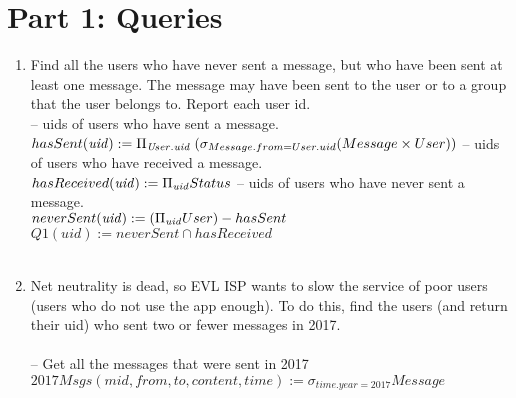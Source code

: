 \documentclass{article}
\newcommand{\var}[1]{\mathit{#1}}
\begin{document}
\section*{Part 1: Queries}

\begin{enumerate}

\item   %
Find all the users who have never sent a message, but who have been sent at least one message. The message may have been sent to the user or to a group that the user belongs to. Report each user id. \\

{\large %
\hspace*{1cm} --  uids of users who have sent a message. \\ [5pt]
$
hasSent(\var{uid}) :=
	\Pi_{\var{User.uid}}\;	%
	(\sigma_{Message.from = User.uid} 
	(Message \times User)) \\\\[5pt]
$
\hspace*{1cm} -- uids of users who have received a message. \\[5pt]
$
hasReceived(\var{uid}) := 
	\Pi_{\var{uid}} 
	Status 
	\\\\[5pt]
$
\hspace*{1cm} -- uids of users who have never sent a message. \\[5pt]
$
neverSent(\var{uid}) := 
	(\Pi_{\var{uid}} User) - hasSent 
	\\\\[5pt]
$
$
Q1(\var{uid}) :=
	neverSent \cap hasReceived
$\\\\ %

} %


\item   %
Net neutrality is dead, so EVL ISP wants to slow the service of poor users (users who do not use the app enough). To do this, find the users (and return their uid) who sent two or fewer messages in 2017.\\\\
{\large
\hspace*{1cm} -- Get all the messages that were sent in 2017 \\ [5pt]
$
2017Msgs(\var{mid}, \var{from}, \var{to}, \var{content}, \var{time}) :=
	\sigma_{time.year = 2017} Message
$\\

}
\end{enumerate}
\end{document}
